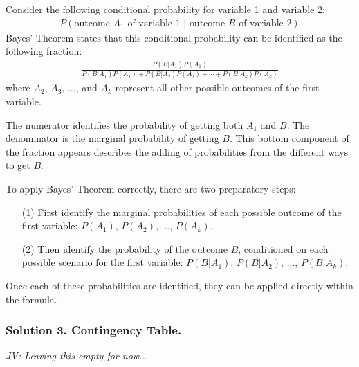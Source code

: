 \begin{termBox}{
Consider the following conditional probability for variable 1 and variable 2:\vspace{-1.5mm}
\begin{align*}
P(\text{outcome $A_1$ of variable 1 } | \text{ outcome $B$ of variable 2})
\end{align*}
Bayes' Theorem states that this conditional probability can be identified as the following fraction:\vspace{-1.5mm}
\begin{align}
\frac{P(B | A_1) P(A_1)}
	{P(B | A_1) P(A_1) + P(B | A_2) P(A_2) + \cdots + P(B | A_k) P(A_k)}
	\label{equationOfBayesTheorem}
\end{align}
where $A_2$, $A_3$, ..., and $A_k$ represent all other possible outcomes of the first variable.}
\end{termBox}

The numerator identifies the probability of getting both $A_1$ and $B$. The denominator is the marginal probability of getting $B$. This bottom component of the fraction appears describes the adding of probabilities from the different ways to get $B$. 

To apply Bayes' Theorem correctly, there are two preparatory steps:
\begin{enumerate}
\setlength{\itemsep}{0mm}
\item[(1)] First identify the marginal probabilities of each possible outcome of the first variable: $P(A_1)$, $P(A_2)$, ..., $P(A_k)$.
\item[(2)] Then identify the probability of the outcome $B$, conditioned on each possible scenario for the first variable: $P(B | A_1)$, $P(B | A_2)$, ..., $P(B | A_k)$.
\end{enumerate}
Once each of these probabilities are identified, they can be applied directly within the formula.

\subsubsection{Solution 3. Contingency Table.}

\textit{JV: Leaving this empty for now...}

%



